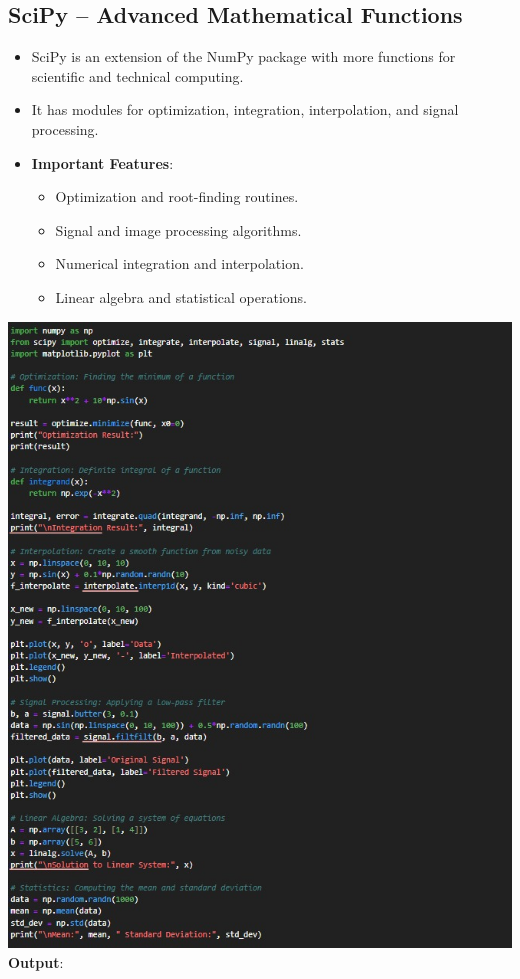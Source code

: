 \documentclass{article}
\begin{document}
\subsection{SciPy – Advanced Mathematical Functions}
\begin{itemize}
    \item SciPy is an extension of the NumPy package with more functions for scientific and technical computing.
    \item It has modules for optimization, integration, interpolation, and signal processing.
    \item \textbf{Important Features}:
    \begin{itemize}
    \item Optimization and root-finding routines.
    \item Signal and image processing algorithms.
    \item Numerical integration and interpolation.
    \item Linear algebra and statistical operations.
    \end{itemize}
\end{itemize}
\includegraphics[width=14cm,height=18
cm]{SciPy.jpeg}
\newpage
\textbf{Output}:
\end{document}
